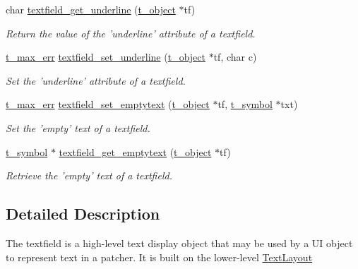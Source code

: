 \begin{DoxyCompactItemize}
char \hyperlink{group__textfield_gadc8b41ef216b8c539456c0298ca179cd}{textfield\_\-get\_\-underline} (\hyperlink{structt__object}{t\_\-object} $\ast$tf)
\begin{DoxyCompactList}\small\item\em Return the value of the 'underline' attribute of a textfield. \item\end{DoxyCompactList}\item 
\hyperlink{group__datatypes_ga73edaae82b318855cc09fac994918165}{t\_\-max\_\-err} \hyperlink{group__textfield_gafd1fa42ebe95f4ff0e4d6c2073e4d3c7}{textfield\_\-set\_\-underline} (\hyperlink{structt__object}{t\_\-object} $\ast$tf, char c)
\begin{DoxyCompactList}\small\item\em Set the 'underline' attribute of a textfield. \item\end{DoxyCompactList}\item 
\hyperlink{group__datatypes_ga73edaae82b318855cc09fac994918165}{t\_\-max\_\-err} \hyperlink{group__textfield_ga68ba343fcf9437717204b5a383cd10f7}{textfield\_\-set\_\-emptytext} (\hyperlink{structt__object}{t\_\-object} $\ast$tf, \hyperlink{structt__symbol}{t\_\-symbol} $\ast$txt)
\begin{DoxyCompactList}\small\item\em Set the 'empty' text of a textfield. \item\end{DoxyCompactList}\item 
\hyperlink{structt__symbol}{t\_\-symbol} $\ast$ \hyperlink{group__textfield_ga9abc9b5b91181e224a1ea249786b002f}{textfield\_\-get\_\-emptytext} (\hyperlink{structt__object}{t\_\-object} $\ast$tf)
\begin{DoxyCompactList}\small\item\em Retrieve the 'empty' text of a textfield. \item\end{DoxyCompactList}\end{DoxyCompactItemize}


\subsection{Detailed Description}
The textfield is a high-\/level text display object that may be used by a UI object to represent text in a patcher. It is built on the lower-\/level \hyperlink{group__textlayout}{TextLayout} 

